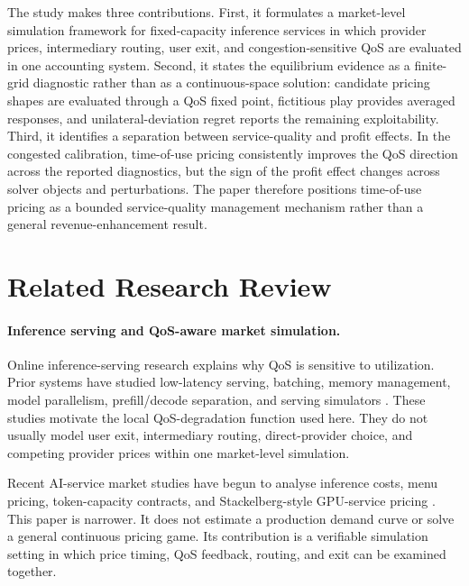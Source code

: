 \documentclass[11pt,a4paper]{article}
\begin{document}
The study makes three contributions. First, it formulates a market-level simulation framework for fixed-capacity inference services in which provider prices, intermediary routing, user exit, and congestion-sensitive QoS are evaluated in one accounting system. Second, it states the equilibrium evidence as a finite-grid diagnostic rather than as a continuous-space solution: candidate pricing shapes are evaluated through a QoS fixed point, fictitious play provides averaged responses, and unilateral-deviation regret reports the remaining exploitability. Third, it identifies a separation between service-quality and profit effects. In the congested calibration, time-of-use pricing consistently improves the QoS direction across the reported diagnostics, but the sign of the profit effect changes across solver objects and perturbations. The paper therefore positions time-of-use pricing as a bounded service-quality management mechanism rather than a general revenue-enhancement result.

\section{Related Research Review}
\label{sec:related}

\paragraph{Inference serving and QoS-aware market simulation.}

Online inference-serving research explains why QoS is sensitive to utilization. Prior systems have studied low-latency serving, batching, memory management, model parallelism, prefill/decode separation, and serving simulators \cite{crankshaw2017clipper,gujarati2020clockwork,romero2021infaas,yu2022orca,li2023alpaserve,sheng2023flexgen,kwon2023pagedattention,agrawal2024sarathiserve,patel2024splitwise,zhong2024distserve,agrawal2024vidur}. These studies motivate the local QoS-degradation function used here. They do not usually model user exit, intermediary routing, direct-provider choice, and competing provider prices within one market-level simulation.

Recent AI-service market studies have begun to analyse inference costs, menu pricing, token-capacity contracts, and Stackelberg-style GPU-service pricing \cite{demirer2025emerging,erdil2025inference,bergemann2025menu,guo2026prillm,yan2026stackelberg,cunningham2026token,liu2026locational}. This paper is narrower. It does not estimate a production demand curve or solve a general continuous pricing game. Its contribution is a verifiable simulation setting in which price timing, QoS feedback, routing, and exit can be examined together.
\end{document}

